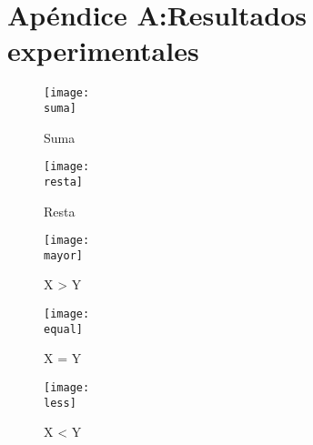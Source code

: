 \documentclass[a4paper, 12pt]{article}
\newcommand{\suma}{img/30.png}
\newcommand{\resta}{img/menos30.png}
\newcommand{\equal}{img/equal30.png}
\newcommand{\less}{img/less.png}
\newcommand{\mayor}{img/g.png}
\begin{document}
    \section*{Apéndice A:Resultados experimentales}
    \begin{figure}[H]
        \centering
        \texttt{[image: \\suma]}
        \caption{Suma}
    \end{figure}
    \begin{figure}[H]
        \centering
        \texttt{[image: \\resta]}
        \caption{Resta}
    \end{figure}
    \begin{figure}[H]
        \centering
        \texttt{[image: \\mayor]}
        \caption{X > Y}
    \end{figure}
    \begin{figure}[H]
        \centering
        \texttt{[image: \\equal]}
        \caption{X = Y}
    \end{figure}
    \begin{figure}[H]
        \centering
        \texttt{[image: \\less]}
        \caption{X < Y}
    \end{figure}
\end{document}
